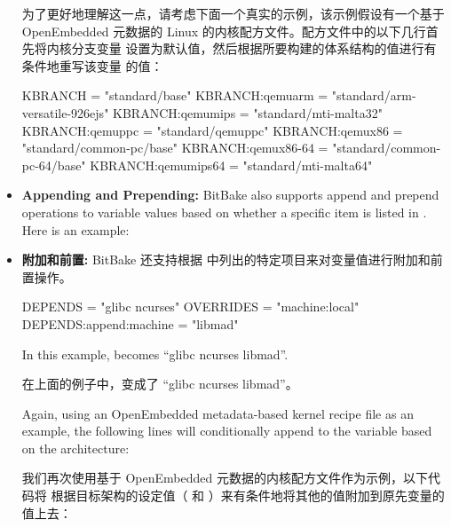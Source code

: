 \begin{itemize}
\medskip
为了更好地理解这一点，请考虑下面一个真实的示例，该示例假设有一个基于 OpenEmbedded 元数据的 Linux 的内核配方文件。配方文件中的以下几行首先将内核分支变量  设置为默认值，然后根据所要构建的体系结构的值进行有条件地重写该变量  的值：

\medskip
\begin{pyglist}
KBRANCH = "standard/base"
KBRANCH:qemuarm = "standard/arm-versatile-926ejs"
KBRANCH:qemumips = "standard/mti-malta32"
KBRANCH:qemuppc = "standard/qemuppc"
KBRANCH:qemux86 = "standard/common-pc/base"
KBRANCH:qemux86-64 = "standard/common-pc-64/base"
KBRANCH:qemumips64 = "standard/mti-malta64"
\end{pyglist}

\item \textbf{Appending and Prepending:} BitBake also supports append and prepend operations to variable values based on whether a specific item is listed in . Here is an example:

\item \textbf{附加和前置:} BitBake 还支持根据  中列出的特定项目来对变量值进行附加和前置操作。

\begin{pyglist}
DEPENDS = "glibc ncurses"
OVERRIDES = "machine:local"
DEPENDS:append:machine = "libmad"
\end{pyglist}

\medskip
In this example, \footnotemark[1] becomes ``glibc ncurses libmad''.

\medskip
在上面的例子中，\footnotemark[1] 变成了 ``glibc ncurses libmad''。

\medskip
{}

\medskip
Again, using an OpenEmbedded metadata-based kernel recipe file as an example, the following lines will conditionally append to the  variable based on the architecture:

\medskip
我们再次使用基于 OpenEmbedded 元数据的内核配方文件作为示例，以下代码将  根据目标架构的设定值（ 和 ）来有条件地将其他的值附加到原先变量的值上去：

\medskip
{}


\end{itemize}
